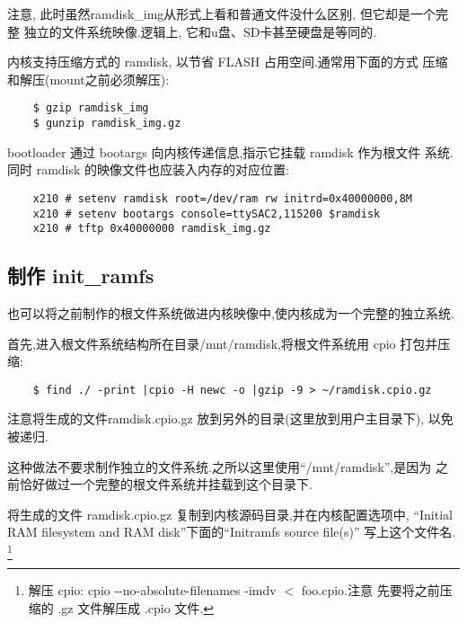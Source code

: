 	注意, 此时虽然ramdisk\_img从形式上看和普通文件没什么区别, 但它却是一个完整
独立的文件系统映像.逻辑上, 它和u盘、SD卡甚至硬盘是等同的.

	内核支持压缩方式的 ramdisk, 以节省 FLASH 占用空间.通常用下面的方式
压缩和解压(mount之前必须解压):

\begin{boxedminipage}{.9\textwidth}
\begin{verbatim}
	$ gzip ramdisk_img
	$ gunzip ramdisk_img.gz
\end{verbatim}
\end{boxedminipage}

	bootloader 通过 bootargs 向内核传递信息,指示它挂载 ramdisk 作为根文件
系统.同时 ramdisk 的映像文件也应装入内存的对应位置:

\begin{boxedminipage}{.9\textwidth}
\begin{verbatim}
	x210 # setenv ramdisk root=/dev/ram rw initrd=0x40000000,8M
	x210 # setenv bootargs console=ttySAC2,115200 $ramdisk
	x210 # tftp 0x40000000 ramdisk_img.gz
\end{verbatim}
\end{boxedminipage}

\subsection{制作 init\_ramfs}
	也可以将之前制作的根文件系统做进内核映像中,使内核成为一个完整的独立系统.

	首先,进入根文件系统结构所在目录/mnt/ramdisk,将根文件系统用 cpio
    打包并压缩:

\begin{boxedminipage}{.9\textwidth}
\begin{verbatim}
	$ find ./ -print |cpio -H newc -o |gzip -9 > ~/ramdisk.cpio.gz
\end{verbatim}
\end{boxedminipage}

    注意将生成的文件ramdisk.cpio.gz 放到另外的目录(这里放到用户主目录下),
    以免被递归.

	这种做法不要求制作独立的文件系统.之所以这里使用``/mnt/ramdisk'',是因为
之前恰好做过一个完整的根文件系统并挂载到这个目录下.

	将生成的文件 ramdisk.cpio.gz 复制到内核源码目录,并在内核配置选项中,
``Initial RAM filesystem and RAM disk''下面的``Initramfs source file(s)''
写上这个文件名.
\footnote{解压 cpio: cpio -{}-no-absolute-filenames -imdv $<$ foo.cpio.注意
    先要将之前压缩的 .gz 文件解压成 .cpio 文件.}

